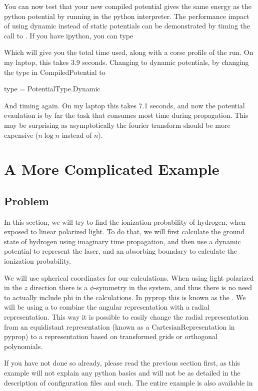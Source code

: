 You can now test that your new compiled potential gives the same energy as the python potential by running
 in the python interpreter. The performance impact of using dynamic instead of static potentials
can be demonstrated by timing the call to . If you have ipython, you can type
\begin{python}
\end{python}
Which will give you the total time used, along with a corse profile of the run. On my laptop, this takes 3.9 seconds. 
Changing to dynamic potentials, by changing the type in CompiledPotential to
\begin{python}
	type = PotentialType.Dynamic
\end{python}
And timing  again. On my laptop this takes 7.1 seconds, and now the potential evaulation is 
by far the 
task that consumes most time during propagation. This may be surprising as asymptotically the fourier transform should be more
expensive ($n \log n$ instead of $n$).


\section{A More Complicated Example}
\subsection{Problem}
In this section, we will try to find the ionization probability of hydrogen, when exposed to linear polarized light.
To do that, we will first calculate the ground state of hydrogen using imaginary time propagation, and then use
a dynamic potential to represent the laser, and an absorbing boundary to calculate the ionization probability.

We will use spherical coordinates for our calculations. When using light polarized in the $z$ direction there is a
$\phi$-symmetry in the system, and thus there is no need to actually include phi in the calculations. In pyprop this
is known as the . We will be using a  to combine
the angular representation with a radial representation. This way it is possible to easily change the radial representation 
from an equidistant representation (known as a CartesianRepresentation in pyprop) to a representation based on transformed
grids or orthogonal polynomials.

If you have not done so already, please read the previous section first, as this example will not explain any python basics
and will not be as detailed in the description of configuration files and such. The entire example is also available in 

